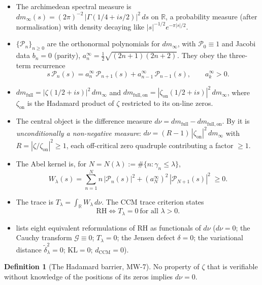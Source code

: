 \documentclass[11pt]{amsart}
\theoremstyle{definition}
\newtheorem{definition}[theorem]{Definition}
\theoremstyle{remark}
\newcommand{\RH}{\mathrm{RH}}
\newcommand{\bbR}{\mathbb{R}}
\newcommand{\dm}{dm_\infty}
\newcommand{\dmfull}{dm_{\mathrm{full}}}
\newcommand{\dmon}{dm_{\mathrm{full,on}}}
\newcommand{\dnu}{d\nu}
\newcommand{\Wl}{W_\lambda}
\newcommand{\Tl}{T_\lambda}
\begin{document}
\begin{itemize}
\item The archimedean spectral measure is
$\dm(s)=(2\pi)^{-2}\,|\Gamma(1/4+is/2)|^2\,ds$ on $\bbR$, a probability
measure (after normalisation) with density decaying like
$|s|^{-1/2}e^{-\pi|s|/2}$.
\item $\{\mathcal{P}_n\}_{n\geq0}$ are the orthonormal polynomials for
$\dm$, with $\mathcal{P}_0\equiv1$ and Jacobi data $b_n=0$ (parity),
$a_n^\infty=\tfrac12\sqrt{(2n+1)(2n+2)}$. They obey the three-term
recurrence
\begin{equation}\label{eq:ttr}
s\,\mathcal{P}_n(s)=a_n^\infty\,\mathcal{P}_{n+1}(s)+a_{n-1}^\infty\,\mathcal{P}_{n-1}(s),
\qquad a_k^\infty>0.
\end{equation}
\item $\dmfull=|\zeta(1/2+is)|^2\,\dm$ and $\dmon=|\zeta_{\mathrm{on}}(1/2+is)|^2\,\dm$,
where $\zeta_{\mathrm{on}}$ is the Hadamard product of $\zeta$ restricted to
its on-line zeros.
\item The central object is the difference measure
$\dnu=\dmfull-\dmon$. By \cite[]{P40} it is \emph{unconditionally a
non-negative measure}: $\dnu=(R-1)\,|\zeta_{\mathrm{on}}|^2\,\dm$ with
$R=|\zeta/\zeta_{\mathrm{on}}|^2\geq1$, each off-critical zero quadruple
contributing a factor $\geq1$.
\item The Abel kernel is, for $N=N(\lambda):=\#\{n:\gamma_n\leq\lambda\}$,
\begin{equation}\label{eq:wlambda}
\Wl(s)=\sum_{n=1}^{N} n\,|\mathcal{P}_n(s)|^2+(a_N^\infty)^2\,|\mathcal{P}_{N+1}(s)|^2\;\geq0.
\end{equation}
\item The trace is $\Tl=\int_\bbR \Wl\,\dnu$. The CCM trace criterion
\cite[Thm]{P39} states
\begin{equation}\label{eq:p39}
\RH\iff \Tl=0\ \text{for all }\lambda>0.
\end{equation}
\item \cite[]{P40} lists eight equivalent reformulations of RH as
functionals of $\dnu$ ($\dnu=0$; the Cauchy transform $\mathcal{G}\equiv0$;
$\Tl=0$; the Jensen defect $\delta=0$; the variational distance
$\tilde\delta_\lambda^2=0$; $\mathrm{KL}=0$; $d_{\mathrm{CCM}}=0$).
\end{itemize}

\begin{definition}[The Hadamard barrier, MW-7]\label{def:hadamard}
No property of $\zeta$ that is verifiable without knowledge of the
positions of its zeros implies $\dnu=0$.
\end{definition}
\end{document}

